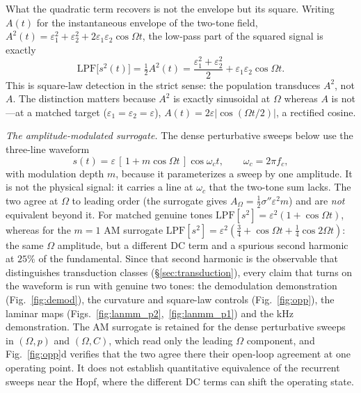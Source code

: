 \documentclass[11pt,a4paper]{article}
\newcommand{\Sig}{\sigma}
\newcommand{\half}{\tfrac{1}{2}}
\providecommand{\DIFaddtex}[1]{{\protect\color{blue} \sf #1}} %
\providecommand{\DIFdeltex}[1]{{\protect\color{red} \scriptsize #1}} %
\providecommand{\DIFaddbegin}{} %
\providecommand{\DIFaddend}{} %
\providecommand{\DIFdelbegin}{} %
\providecommand{\DIFdelend}{} %
\providecommand{\DIFadd}[1]{\texorpdfstring{\DIFaddtex{#1}}{#1}} %
\providecommand{\DIFdel}[1]{\texorpdfstring{\DIFdeltex{#1}}{}} %
\begin{document}
What the quadratic term recovers is not the envelope but its square. Writing $A(t)$ for
the instantaneous envelope of the two-tone field,
$A^2(t)=\varepsilon_1^2+\varepsilon_2^2+2\varepsilon_1\varepsilon_2\cos\Omega t$, the
low-pass part of the squared signal is exactly
\begin{equation}
\mathrm{LPF}\big[s^2(t)\big]=\half A^2(t)
=\frac{\varepsilon_1^2+\varepsilon_2^2}{2}+\varepsilon_1\varepsilon_2\cos\Omega t .
\label{eq:sqenv}
\end{equation}
This is square-law detection in the strict sense: the population transduces $A^2$, not
$A$. The distinction matters because $A^2$ is exactly sinusoidal at $\Omega$
whereas $A$ is not---at a matched target ($\varepsilon_1=\varepsilon_2=\varepsilon$),
$A(t)=2\varepsilon|\cos(\Omega t/2)|$, a rectified cosine.

\emph{The amplitude-modulated surrogate.} The dense perturbative sweeps below use the
three-line waveform
\begin{equation}
s(t)=\varepsilon\,[\,1+m\cos\Omega t\,]\cos\omega_c t,\qquad \omega_c=2\pi f_c ,
\label{eq:amsur}
\end{equation}
with modulation depth $m$, because it parameterizes a sweep by one amplitude. It is not
the physical signal: it carries a line at $\omega_c$ that the two-tone sum lacks. The two
agree at $\Omega$ to leading order (the surrogate gives
$A_\Omega=\half\Sig''\varepsilon^2m$) and are \emph{not} equivalent beyond it. For matched genuine tones $\mathrm{LPF}[s^2]=\varepsilon^2(1+\cos\Omega t)$,
whereas for the $m=1$ AM surrogate
$\mathrm{LPF}[s^2]=\varepsilon^2(\tfrac34+\cos\Omega t+\tfrac14\cos2\Omega t)$: the same
$\Omega$ amplitude, but a different DC term and a spurious second harmonic at $25\%$ of
the fundamental. Since that second harmonic is the observable that
distinguishes transduction classes (\S\ref{sec:transduction}), every claim that turns on
the waveform is run with genuine two tones: the demodulation demonstration
(Fig.~\ref{fig:demod}), the curvature and square-law controls (Fig.~\ref{fig:opp}), the
laminar maps (Figs.~\ref{fig:lanmm_p2},~\ref{fig:lanmm_p1}) and the kHz demonstration.
The AM surrogate is retained for the dense perturbative sweeps in $(\Omega,p)$ and
$(\Omega,C)$, which read only the leading $\Omega$ component, and
Fig.~\ref{fig:opp}d verifies \DIFdelbegin \DIFdel{that the two agree there}\DIFdelend \DIFaddbegin \DIFadd{their open-loop agreement at one operating point.
It does not establish quantitative equivalence of the recurrent sweeps near the Hopf,
where the different DC terms can shift the operating state}\DIFaddend .
\end{document}

